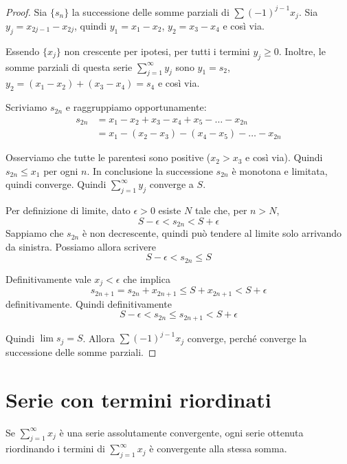 \begin{proof}
Sia $\{s_n\}$ la successione delle somme parziali di $\sum (-1)^{j-1} x_j$. Sia $y_j = x_{2j-1} - x_{2j}$, quindi $y_1 = x_1 - x_2$, $y_2 = x_3 - x_4$ e così via.

Essendo $\{x_j\}$ non crescente per ipotesi, per tutti i termini $y_j \ge 0$. Inoltre, le somme parziali di questa serie $\sum_{j=1}^\infty y_j$ sono $y_1 = s_2$, $y_2 = (x_1-x_2)+(x_3-x_4) = s_4$ e così via.

Scriviamo $s_{2n}$ e raggruppiamo opportunamente:
\begin{align*}
s_{2n} &= x_1 - x_2 + x_3 - x_4 + x_5 - \ldots - x_{2n} \\
&= x_1 - (x_2 - x_3) - (x_4 - x_5) - \ldots - x_{2n}
\end{align*}

Osserviamo che tutte le parentesi sono positive ($x_2 > x_3$ e così via). Quindi $s_{2n} \le x_1$ per ogni $n$. In conclusione la successione $s_{2n}$ è monotona e limitata, quindi converge. Quindi $\sum_{j=1}^\infty y_j$ converge a $S$.

Per definizione di limite, dato $\epsilon > 0$ esiste $N$ tale che, per $n > N$,
\begin{equation*}
S - \epsilon < s_{2n} < S + \epsilon
\end{equation*}
Sappiamo che $s_{2n}$ è non decrescente, quindi può tendere al limite solo arrivando da sinistra. Possiamo allora scrivere
\begin{equation*}
S - \epsilon < s_{2n} \le S
\end{equation*}

Definitivamente vale $x_j < \epsilon$ che implica
\begin{equation*}
s_{2n+1} = s_{2n}+x_{2n+1} \le S + x_{2n+1} < S + \epsilon
\end{equation*}
definitivamente. Quindi definitivamente
\begin{equation*}
S - \epsilon < s_{2n} \le s_{2n+1} < S + \epsilon
\end{equation*}

Quindi $\lim s_j = S$. Allora $\sum (-1)^{j-1} x_j$ converge, perché converge la successione delle somme parziali.
\end{proof}

\section{Serie con termini riordinati}

\begin{theorem} 
Se $\sum_{j=1}^\infty x_j$ è una serie assolutamente convergente, ogni serie ottenuta riordinando i termini di $\sum_{j=1}^\infty x_j$ è convergente alla stessa somma.
\end{theorem} 

